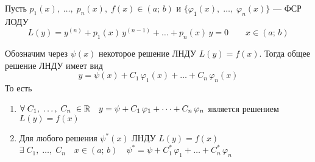\begin{Th}
    Пусть $p_1(x),\; \dots,\; p_n(x),\; f(x) \in (a;\, b)$ и $\{\varphi_1(x),\; \dots,\; \varphi_n(x)\}$ --- ФСР ЛОДУ
    \[
        L(y) = y^{(n)} + p_1(x)\,y^{(n - 1)} + \dots + p_n(x)\,y = 0 \qquad x\in (a;\,b)    
    \]
    
    Обозначим через $\psi(x)$ некоторое решение ЛНДУ $L(y) = f(x)$. Тогда общее решение ЛНДУ имеет вид
    \[
        y = \psi(x) + C_1\,\varphi_1(x) + \dots + C_n\,\varphi_n(x)
    \]
    То есть
    \begin{enumerate}
        \item $\forall \; C_1,\; \dots,\; C_n \; \in \mathbb{R} \quad y = \psi + C_1\,\varphi_1 + \dots + C_n\,\varphi_n$ является решением $L(y) = f(x)$
            
        \item Для любого решения $\psi^*(x)$ ЛНДУ $L(y) = f(x)$\\
        $\exists \; C_1,\; \dots,\; C_n \quad x\in(a;\,b) \quad \psi^* = \psi + C_1^*\,\varphi_1 + \dots + C_n^*\,\varphi_n$
            
    \end{enumerate}
\end{Th}

